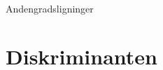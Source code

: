 \documentclass[12pt]{article}
\begin{document}



\begin{center}
\Huge
	Andengradsligninger
\end{center}

\section*{Diskriminanten}
\end{document}

